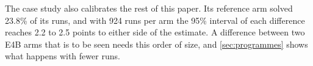 The case study also calibrates the rest of this paper. Its reference arm solved 23.8\% of its runs, and with 924 runs per arm the 95\% interval of each difference
reaches 2.2 to 2.5 points to either side of the estimate. A difference between two E4B arms that
is to be seen needs this order of size, and \cref{sec:programmes} shows what happens with fewer runs.
